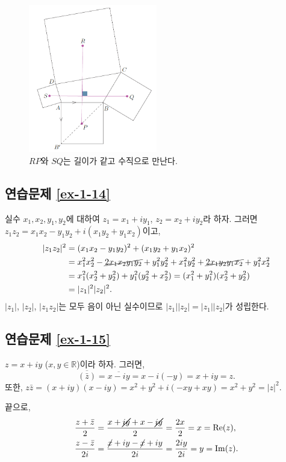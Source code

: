 \begin{figure}[h!]
\begin{center}
\includegraphics[width=0.5\textwidth]{./Solution/figs/fig-5-5}
\end{center}
\caption{$RP$와 $SQ$는 길이가 같고 수직으로 만난다.}
\label{fig-5-5}
\end{figure}

\subsection*{연습문제 \ref{ex-1-14}}

실수 $x_1, x_2, y_1, y_2$에 대하여
$z_1 = x_1 + iy_1$, $z_2 = x_2 + iy_2$라 하자.
그러면 $z_1z_2 = x_1x_2 - y_1y_2 + i(x_1y_2+y_1x_2)$이고,
\begin{align*}
|z_1z_2|^2 &=  (x_1x_2 - y_1y_2)^2 + (x_1y_2 + y_1x_2)^2 \\
&= x_1^2x_2^2 - \cancel{2x_1x_2y_1y_2} + y_1^2y_2^2
+ x_1^2y_2^2 + \cancel{2x_1y_2y_1x_2} + y_1^2x_2^2 \\
&=x_1^2(x_2^2+y_2^2) + y_1^2(y_2^2+x_2^2)
= (x_1^2+y_1^2)(x_2^2+y_2^2) \\
&= |z_1|^2|z_2|^2.
\end{align*}
$|z_1|$, $|z_2|$, $|z_1z_2|$는 모두 음이 아닌 실수이므로
$|z_1||z_2| = |z_1||z_2|$가 성립한다.

\subsection*{연습문제 \ref{ex-1-15}}

$z=x+iy$ ($x,y\in\mathbb R$)이라 하자. 그러면,
\[
\overline{(\bar z)} = \overline{x-iy}
= x - i(-y) = x+iy = z.
\]
또한, $z\bar z = (x+iy)(x-iy) = x^2+y^2 + i(- xy + xy)
= x^2+y^2 = |z|^2$.

끝으로,
\begin{align*}
\dfrac{z + \bar z}2 &= \dfrac{x+\cancel{iy}+ x -\cancel{iy}}2
= \dfrac{2x}2 = x =\Re(z), \\
\dfrac{z - \bar z}{2i} &= \dfrac{\cancel{x}+iy - \cancel{x} +iy}{2i}
= \dfrac{2iy}{2i} = y = \Im(z).
\end{align*}

